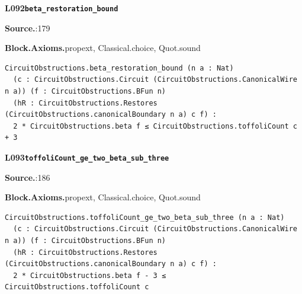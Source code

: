 \par\medskip\noindent\begin{minipage}{\textwidth}
{\small\bfseries L092\enspace\texttt{beta\_restoration\_bound}\par}
{\footnotesize\raggedright\textbf{Source.}\enspace{}:179\par
\textbf{Block.}\quad\textbf{Axioms.}\enspace propext, Classical.choice, Quot.sound\par}\nopagebreak
\begin{lstlisting}
CircuitObstructions.beta_restoration_bound (n a : Nat)
  (c : CircuitObstructions.Circuit (CircuitObstructions.CanonicalWire n a)) (f : CircuitObstructions.BFun n)
  (hR : CircuitObstructions.Restores (CircuitObstructions.canonicalBoundary n a) c f) :
  2 * CircuitObstructions.beta f ≤ CircuitObstructions.toffoliCount c + 3
\end{lstlisting}
\end{minipage}\par

\par\medskip\noindent\begin{minipage}{\textwidth}
{\small\bfseries L093\enspace\texttt{toffoliCount\_ge\_two\_beta\_sub\_three}\par}
{\footnotesize\raggedright\textbf{Source.}\enspace{}:186\par
\textbf{Block.}\quad\textbf{Axioms.}\enspace propext, Classical.choice, Quot.sound\par}\nopagebreak
\begin{lstlisting}
CircuitObstructions.toffoliCount_ge_two_beta_sub_three (n a : Nat)
  (c : CircuitObstructions.Circuit (CircuitObstructions.CanonicalWire n a)) (f : CircuitObstructions.BFun n)
  (hR : CircuitObstructions.Restores (CircuitObstructions.canonicalBoundary n a) c f) :
  2 * CircuitObstructions.beta f - 3 ≤ CircuitObstructions.toffoliCount c
\end{lstlisting}
\end{minipage}\par

